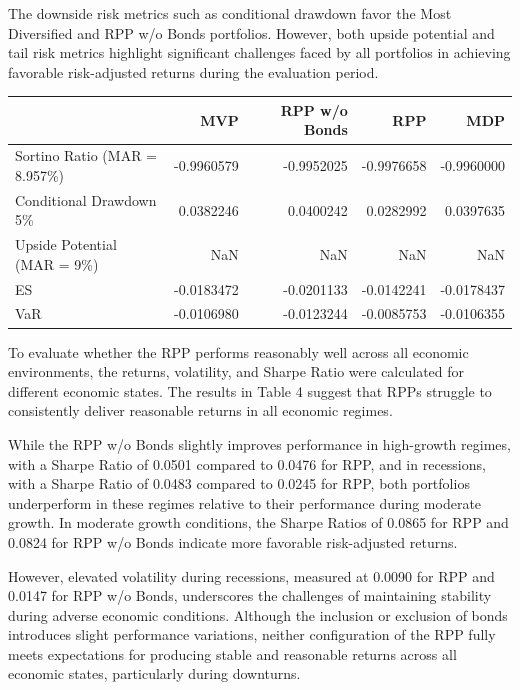 \documentclass[11pt,preprint]{elsarticle}
\let\origtable\table
\let\endorigtable\endtable
\renewenvironment{table}[1][2] {
    \expandafter\origtable\expandafter[H]
} {
    \endorigtable
}
\numberwithin{equation}{section}
\numberwithin{figure}{section}
\numberwithin{table}{section}
\begin{document}
The downside risk metrics such as conditional drawdown favor the Most
Diversified and RPP w/o Bonds portfolios. However, both upside potential
and tail risk metrics highlight significant challenges faced by all
portfolios in achieving favorable risk-adjusted returns during the
evaluation period.

\begin{table}
\centering
\caption{\label{tab:downside-metrics}Downside and Opportunity-based Performance Metrics}
\centering
\begin{tabular}[t]{l|r|r|r|r}
\hline
  & MVP & RPP w/o Bonds & RPP & MDP\\
\hline
Sortino Ratio (MAR = 8.957\%) & -0.9960579 & -0.9952025 & -0.9976658 & -0.9960000\\
\hline
Conditional Drawdown 5\% & 0.0382246 & 0.0400242 & 0.0282992 & 0.0397635\\
\hline
Upside Potential (MAR = 9\%) & NaN & NaN & NaN & NaN\\
\hline
ES & -0.0183472 & -0.0201133 & -0.0142241 & -0.0178437\\
\hline
VaR & -0.0106980 & -0.0123244 & -0.0085753 & -0.0106355\\
\hline
\end{tabular}
\end{table}

To evaluate whether the RPP performs reasonably well across all economic
environments, the returns, volatility, and Sharpe Ratio were calculated
for different economic states. The results in Table 4 suggest that RPPs
struggle to consistently deliver reasonable returns in all economic
regimes.

While the RPP w/o Bonds slightly improves performance in high-growth
regimes, with a Sharpe Ratio of 0.0501 compared to 0.0476 for RPP, and
in recessions, with a Sharpe Ratio of 0.0483 compared to 0.0245 for RPP,
both portfolios underperform in these regimes relative to their
performance during moderate growth. In moderate growth conditions, the
Sharpe Ratios of 0.0865 for RPP and 0.0824 for RPP w/o Bonds indicate
more favorable risk-adjusted returns.

However, elevated volatility during recessions, measured at 0.0090 for
RPP and 0.0147 for RPP w/o Bonds, underscores the challenges of
maintaining stability during adverse economic conditions. Although the
inclusion or exclusion of bonds introduces slight performance
variations, neither configuration of the RPP fully meets expectations
for producing stable and reasonable returns across all economic states,
particularly during downturns.
\end{document}
